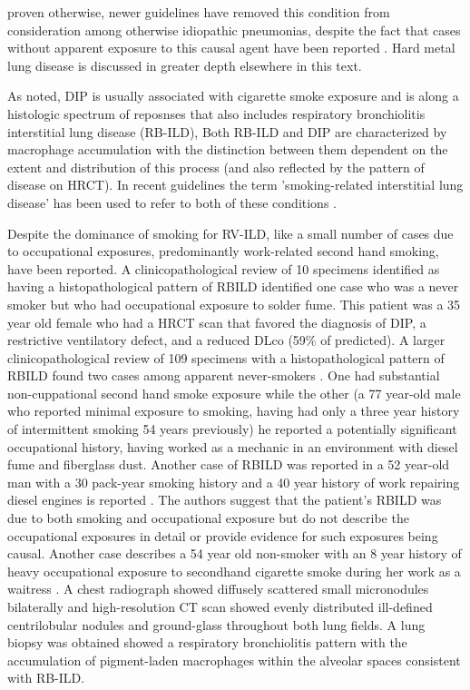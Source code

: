 \documentclass[a4paper,12pt]{article}
\begin{document}
proven otherwise, newer guidelines have removed this condition from consideration among otherwise idiopathic pneumonias, despite the fact that cases without apparent exposure to this causal agent have been reported \cite{Blanc2007}.  Hard metal lung disease is discussed in greater depth elsewhere in this text.

As noted, DIP is usually associated with cigarette smoke exposure and is along a histologic spectrum of reposnses that also includes respiratory bronchiolitis interstitial lung disease (RB-ILD), Both RB-ILD and DIP are characterized by macrophage accumulation with the distinction between them dependent on the extent and distribution of this process (and also reflected by the pattern of disease on HRCT). In recent guidelines the term ’smoking-related interstitial lung disease’ has been used to refer to both of these conditions \cite{Travis2013}. 

Despite the dominance of smoking for RV-ILD, like a small number of cases due to occupational exposures, predominantly work-related second hand smoking, have been reported.
A clinicopathological review of 10 specimens identified as having a histopathological pattern of RBILD \cite{Moon1999} identified one case who was a never smoker but who had occupational exposure to solder fume. This patient was a 35 year old female who had a HRCT scan that favored the diagnosis of DIP, a restrictive ventilatory defect, and a reduced DLco (59\% of predicted). A larger clinicopathological review of 109 specimens with a histopathological pattern of RBILD found two cases among apparent never-smokers \cite{Fraig2002}. One had substantial non-cuppational second hand smoke exposure while the other (a 77 year-old male who reported minimal exposure to smoking, having had only a three year history of intermittent smoking 54 years previously) he reported a potentially significant occupational history, having worked as a mechanic in an environment with diesel fume and fiberglass dust. Another case of RBILD was reported in a 52 year-old man with a 30 pack-year smoking history and a 40 year history of work repairing diesel engines is reported \cite{Canessa2004}. The authors suggest that the patient’s RBILD was due to both smoking and occupational exposure but do not describe the occupational exposures in detail or provide evidence for such exposures being causal. Another case describes a 54 year old non-smoker with an 8 year history of heavy occupational exposure to secondhand cigarette smoke during her work as a waitress \cite{Woo2007}. A chest radiograph showed diffusely scattered small micronodules bilaterally and high-resolution CT scan showed evenly distributed ill-defined centrilobular nodules and ground-glass throughout both lung fields. A lung biopsy was obtained showed a respiratory bronchiolitis pattern with the accumulation of pigment-laden macrophages within the alveolar spaces consistent with RB-ILD.
\end{document}

